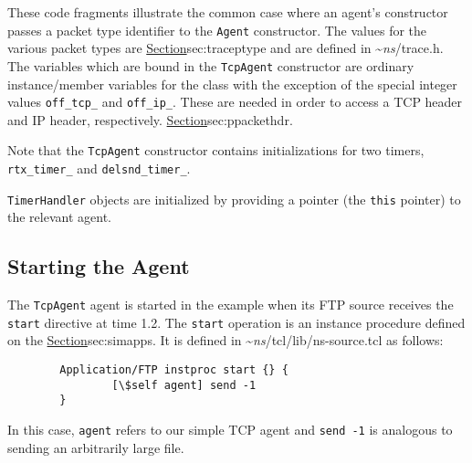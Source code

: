 These code fragments illustrate the common case where an agent's
constructor passes a packet type identifier to the {\tt Agent}
constructor.
The values for the various packet types are
\href{used by the packet tracing facility}{Section}{sec:traceptype}
and are defined in \textasciitilde\emph{ns}/{trace.h}.
The variables which are bound in the {\tt TcpAgent} constructor
are ordinary instance/member variables for the class
with the exception of the special integer values {\tt off\_tcp\_}
and {\tt off\_ip\_}.
These are needed in order to access a TCP header and IP header, respectively.
\href{Additional details are in the section on packet headers}{Section}{sec:ppackethdr}.

Note that the {\tt TcpAgent} constructor contains initializations for
two timers, {\tt rtx\_timer\_} and {\tt delsnd\_timer\_}.

{\tt TimerHandler} 
objects are initialized by providing a pointer (the {\tt this} pointer) to
the relevant agent.

\subsection{Starting the Agent}
\label{sec:starttcp}

The {\tt TcpAgent} agent is started in the example when its
FTP source receives the {\tt start} directive at time 1.2.
The {\tt start} operation is an instance procedure defined on the
\href{class Application/FTP}{Section}{sec:simapps}.
It is defined in \textasciitilde\emph{ns}/{tcl/lib/ns-source.tcl} as follows:
\begin{verbatim}
        Application/FTP instproc start {} {
                [\$self agent] send -1
        }
\end{verbatim}
In this case, {\tt agent} refers to our simple TCP agent and
{\tt send -1} is analogous to sending an arbitrarily large file.


